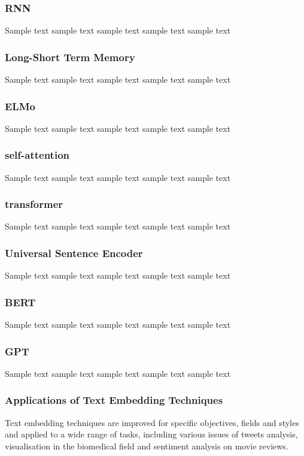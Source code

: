 \subsubsection{RNN}
Sample text sample text sample text sample text sample text

\subsubsection{Long-Short Term Memory}
Sample text sample text sample text sample text sample text

\subsubsection{ELMo}
Sample text sample text sample text sample text sample text

\subsubsection{self-attention}
Sample text sample text sample text sample text sample text

\subsubsection{transformer}
Sample text sample text sample text sample text sample text

\subsubsection{Universal Sentence Encoder}
Sample text sample text sample text sample text sample text

\subsubsection{BERT}
Sample text sample text sample text sample text sample text

\subsubsection{GPT}
Sample text sample text sample text sample text sample text

\subsubsection{Applications of Text Embedding Techniques}
Text embedding techniques are improved for specific objectives, fields and styles and applied to a wide range of tasks, including various issues of tweets analysis\cite{mottaghinia2021}, visualisation in the biomedical field\cite{oubenali2022} and sentiment analysis on movie reviews\cite{sivakumar2021}.

